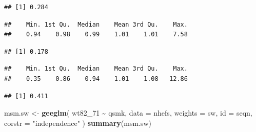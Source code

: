\documentclass[
  10pt,
]{book}
\newenvironment{Shaded}{\begin{snugshade}}{\end{snugshade}}
\newcommand{\DataTypeTok}[1]{\textcolor[rgb]{0.13,0.29,0.53}{#1}}
\newcommand{\DecValTok}[1]{\textcolor[rgb]{0.00,0.00,0.81}{#1}}
\newcommand{\KeywordTok}[1]{\textcolor[rgb]{0.13,0.29,0.53}{\textbf{#1}}}
\newcommand{\NormalTok}[1]{#1}
\newcommand{\OperatorTok}[1]{\textcolor[rgb]{0.81,0.36,0.00}{\textbf{#1}}}
\newcommand{\StringTok}[1]{\textcolor[rgb]{0.31,0.60,0.02}{#1}}
\begin{document}
\begin{verbatim}
## [1] 0.284
\end{verbatim}

\begin{Shaded}
\end{Shaded}

\begin{verbatim}
##    Min. 1st Qu.  Median    Mean 3rd Qu.    Max. 
##    0.94    0.98    0.99    1.01    1.01    7.58
\end{verbatim}

\begin{Shaded}
\end{Shaded}

\begin{verbatim}
## [1] 0.178
\end{verbatim}

\begin{Shaded}
\end{Shaded}

\begin{verbatim}
##    Min. 1st Qu.  Median    Mean 3rd Qu.    Max. 
##    0.35    0.86    0.94    1.01    1.08   12.86
\end{verbatim}

\begin{Shaded}
\end{Shaded}

\begin{verbatim}
## [1] 0.411
\end{verbatim}

\begin{Shaded}
\begin{Highlighting}[]
\NormalTok{msm.sw \textless{}{-}}\StringTok{ }\KeywordTok{geeglm}\NormalTok{(}
\NormalTok{  wt82\_}\DecValTok{71} \OperatorTok{\textasciitilde{}}\StringTok{ }\NormalTok{qsmk,}
  \DataTypeTok{data =}\NormalTok{ nhefs,}
  \DataTypeTok{weights =}\NormalTok{ sw,}
  \DataTypeTok{id =}\NormalTok{ seqn,}
  \DataTypeTok{corstr =} \StringTok{"independence"}
\NormalTok{)}
\KeywordTok{summary}\NormalTok{(msm.sw)}
\end{Highlighting}
\end{Shaded}
\end{document}
